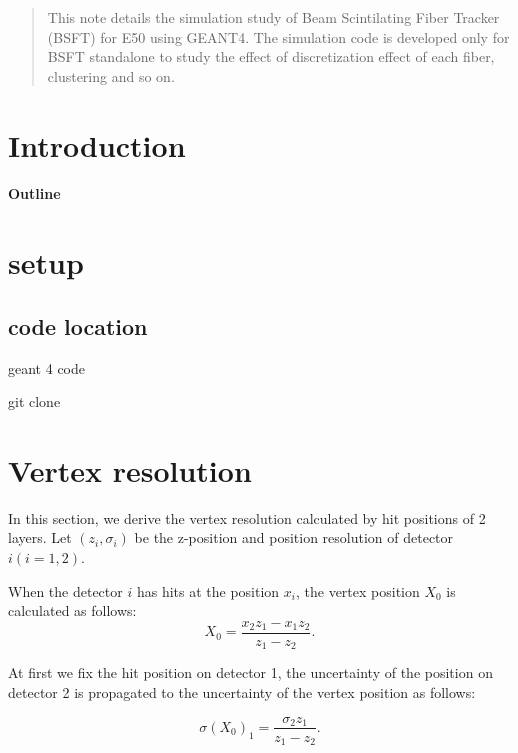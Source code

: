 \documentclass[12pt]{article}
\begin{document}
\maketitle

\begin{abstract}
This note details the simulation study of Beam Scintilating Fiber Tracker (BSFT) for E50 using GEANT4. The simulation code is developed only for BSFT standalone to study the effect of discretization effect of each fiber, clustering and so on.
\end{abstract}

\newpage
\tableofcontents
\newpage

\section{Introduction}

\paragraph{Outline}

\section{setup}

\subsection{code location}
geant 4 code 
\begin{screen}
git clone
\end{screen}

\section{Vertex resolution}
In this section, we derive the vertex resolution calculated by hit positions of 2 layers. 
Let $(z_i,\sigma_i)$ be the z-position and position resolution of detector $i (i=1,2)$.


When the detector $i$ has hits at the position $x_i$, the vertex position $X_0$ is calculated as follows:
\[
X_0 = \frac{x_2z_1 - x_1z_2}{z_1 - z_2}.
\]

At first we fix the hit position on detector 1, the uncertainty of the position on detector 2 is propagated to the uncertainty of the vertex position as follows:

\[
\sigma(X_0)_1 = \frac{\sigma_2z_1}{z_1 - z_2}.
\]
\end{document}
